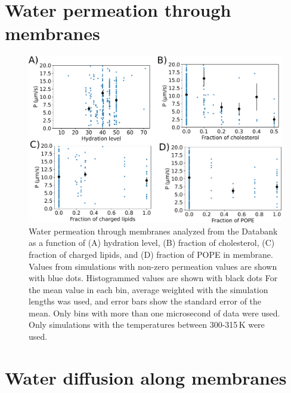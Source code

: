 \documentclass[fleqn,10pt]{wlscirepSI}
\begin{document}
\pagebreak
\section{Water permeation through membranes}

\begin{figure}[!h]
    \centering
    \includegraphics[width = \textwidth]{Figures/permeationSI.pdf}
    \caption{Water permeation through membranes analyzed from the Databank as a function of (A) hydration level, (B) fraction of cholesterol, (C) fraction of charged lipids, and (D) fraction of POPE in membrane. Values from simulations with non-zero permeation values are shown with blue dots. Histogrammed values are shown with black dots For the mean value in each bin, average weighted with the simulation lengths was used, and error bars show the standard error of the mean. Only bins with more than one microsecond of data were used. Only simulations with the temperatures between 300-315\,K were used.
    }
    \label{fig:permeationSI}
\end{figure}

\pagebreak
\section{Water diffusion along membranes}
\end{document}
